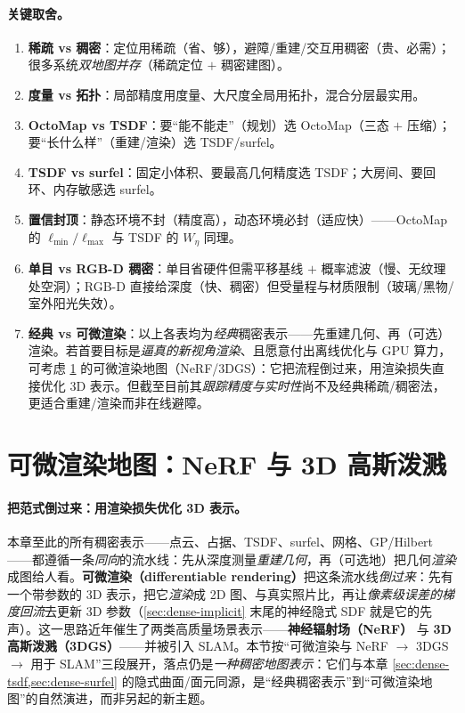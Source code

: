 \paragraph{关键取舍。}
\begin{enumerate}
  \item \textbf{稀疏 vs 稠密}：定位用稀疏（省、够），避障/重建/交互用稠密（贵、必需）；很多系统\emph{双地图并存}（稀疏定位 $+$ 稠密建图）。
  \item \textbf{度量 vs 拓扑}：局部精度用度量、大尺度全局用拓扑，混合分层最实用。
  \item \textbf{OctoMap vs TSDF}：要“能不能走”（规划）选 OctoMap（三态 $+$ 压缩）；要“长什么样”（重建/渲染）选 TSDF/surfel。
  \item \textbf{TSDF vs surfel}：固定小体积、要最高几何精度选 TSDF；大房间、要回环、内存敏感选 surfel。
  \item \textbf{置信封顶}：静态环境不封（精度高），动态环境必封（适应快）——OctoMap 的 $\ell_{\min}/\ell_{\max}$ 与 TSDF 的 $W_\eta$ 同理。
  \item \textbf{单目 vs RGB-D 稠密}：单目省硬件但需平移基线 $+$ 概率滤波（慢、无纹理处空洞）；RGB-D 直接给深度（快、稠密）但受量程与材质限制（玻璃/黑物/室外阳光失效）。
  \item \textbf{经典 vs 可微渲染}：以上各表均为\emph{经典}稠密表示——先重建几何、再（可选）渲染。若首要目标是\emph{逼真的新视角渲染}、且愿意付出离线优化与 GPU 算力，可考虑 \cref{sec:dense-radiance} 的可微渲染地图（NeRF/3DGS）：它把流程倒过来，用渲染损失直接优化 3D 表示。但截至目前其\emph{跟踪精度与实时性}尚不及经典稀疏/稠密法，更适合重建/渲染而非在线避障。
\end{enumerate}

\section{可微渲染地图：NeRF 与 3D 高斯泼溅}
\label{sec:dense-radiance}

\paragraph{把范式倒过来：用渲染损失优化 3D 表示。}
本章至此的所有稠密表示——点云、占据、TSDF、surfel、网格、GP/Hilbert——都遵循一条\emph{同向}的流水线：先从深度测量\emph{重建几何}，再（可选地）把几何\emph{渲染}成图给人看。\textbf{可微渲染（differentiable rendering）}把这条流水线\emph{倒过来}：先有一个带参数的 3D 表示，把它\emph{渲染}成 2D 图、与真实照片比，再让\emph{像素级误差的梯度回流}去更新 3D 参数（\cref{sec:dense-implicit} 末尾的神经隐式 SDF 就是它的先声）。这一思路近年催生了两类高质量场景表示——\textbf{神经辐射场（NeRF）}\cite{mildenhall2020nerf} 与 \textbf{3D 高斯泼溅（3DGS）}\cite{kerbl2023gaussian}——并被引入 SLAM。本节按“可微渲染与 NeRF $\to$ 3DGS $\to$ 用于 SLAM”三段展开，落点仍是\emph{一种稠密地图表示}：它们与本章 \cref{sec:dense-tsdf,sec:dense-surfel} 的隐式曲面/面元同源，是“经典稠密表示”到“可微渲染地图”的自然演进，而非另起的新主题。

